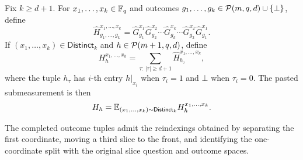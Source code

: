 \begin{definition}\label{def:pasted-measurement}
	\leanok
	Fix $k \ge d+1$. For $x_1,\dots,x_k \in \mathbb{F}_q$ and outcomes $g_1,\dots,g_k \in \mathcal{P}(m,q,d)\cup\{\bot\}$, define
	\[
		\widehat H_{g_1,\dots,g_k}^{x_1,\dots,x_k}
		=
		\widehat G_{g_1}^{x_1}\widehat G_{g_2}^{x_2}\cdots \widehat G_{g_k}^{x_k}\cdots \widehat G_{g_2}^{x_2}\widehat G_{g_1}^{x_1}.
	\]
	If $(x_1,\dots,x_k)\in \mathsf{Distinct}_k$ and $h \in \mathcal{P}(m+1,q,d)$, define
	\[
		H_h^{x_1,\dots,x_k}
		=
		\sum_{\tau:\,|\tau|\ge d+1} \widehat H_{h_\tau}^{x_1,\dots,x_k},
	\]
	where the tuple $h_\tau$ has $i$-th entry $h|_{x_i}$ when $\tau_i=1$ and $\bot$ when $\tau_i=0$. The pasted submeasurement is then
	\[
		H_h = \mathbb{E}_{(x_1,\dots,x_k)\sim \mathsf{Distinct}_k} H_h^{x_1,\dots,x_k}.
	\]
\end{definition}

\begin{definition}\label{def:completed-outcome-reindexing}
	\leanok
	The completed outcome tuples admit the reindexings obtained by separating the
	first coordinate, moving a third slice to the front, and identifying the
	one-coordinate split with the original slice question and outcome spaces.
\end{definition}

